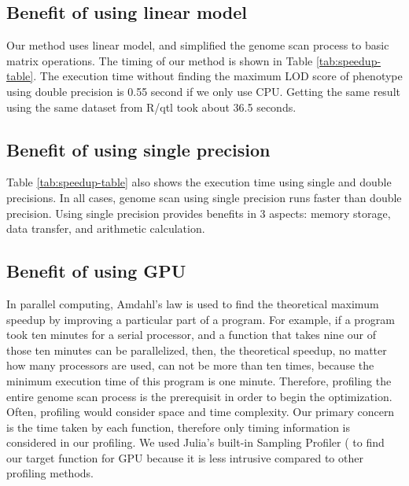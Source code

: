 \documentclass[9pt,twocolumn,twoside,lineno]{gsag3jnl}
\begin{document}
\subsection{Benefit of using linear model}
Our method uses linear model, and simplified the genome scan process to basic matrix operations. 
The timing of our method is shown in Table \ref{tab:speedup-table}. 
The execution time without finding the maximum LOD score of phenotype using double precision is 0.55 second if we only use CPU. 
Getting the same result using the same dataset from R/qtl took about 36.5 seconds. 

\subsection{Benefit of using single precision}
Table \ref{tab:speedup-table} also shows the execution time using single and double precisions. 
In all cases, genome scan using single precision runs faster than double precision. 
Using single precision provides benefits in 3 aspects: memory storage, data transfer, and arithmetic calculation. 

\subsection{Benefit of using GPU}
In parallel computing, Amdahl's law is used to find the theoretical maximum speedup by improving a particular part of a program.  
For example, if a program took ten minutes for a serial processor, and a function that takes nine our of those ten minutes can be parallelized, then, the theoretical speedup, no matter how many processors are used, can not be more than ten times, because the minimum execution time of this program is one minute. 
Therefore, profiling the entire genome scan process is the prerequisit in order to begin the optimization. 
Often, profiling would consider space and time complexity. 
Our primary concern is the time taken by each function, therefore only timing information is considered in our profiling. 
We used Julia's built-in Sampling Profiler (%
to find our target function for GPU because it is less intrusive compared to other profiling methods. 
\end{document}
